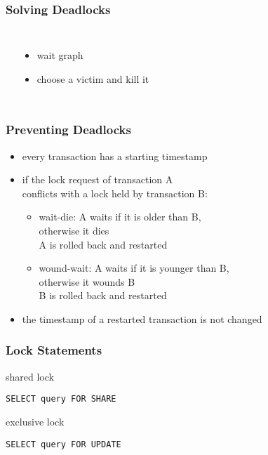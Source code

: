 \documentclass[dvipsnames]{beamer}
\theoremstyle{plain}
\begin{document}
\begin{frame}
  \frametitle{Solving Deadlocks}

  \begin{columns}[t]
    \begin{example}
      \begin{center}
      \end{center}
    \end{example}

    \begin{itemize}
      \item wait graph

      \pause
      \item choose a \alert{victim} and kill it
    \end{itemize}
  \end{columns}
\end{frame}

\begin{frame}
  \frametitle{Preventing Deadlocks}

  \begin{itemize}
    \item every transaction has a starting timestamp

    \pause
    \item if the lock request of transaction A\\
      conflicts with a lock held by transaction B:
    \begin{itemize}
      \item \alert{wait-die}: A waits if it is older than B,\\
	otherwise it dies\\
        A is rolled back and restarted

      \item \alert{wound-wait}: A waits if it is younger than B,\\
	otherwise it wounds B\\
        B is rolled back and restarted
    \end{itemize}

    \pause
    \item the timestamp of a restarted transaction is not changed
  \end{itemize}
\end{frame}

\begin{frame}[fragile]
  \frametitle{Lock Statements}

  \begin{block}{shared lock}
    \begin{lstlisting}
SELECT query FOR SHARE
    \end{lstlisting}
  \end{block}

  \pause
  \begin{block}{exclusive lock}
    \begin{lstlisting}
SELECT query FOR UPDATE
    \end{lstlisting}
  \end{block}
\end{frame}
\end{document}
